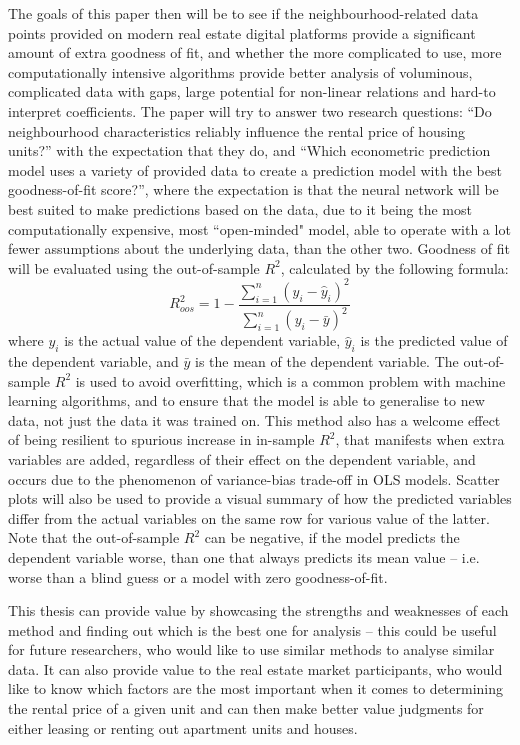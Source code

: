 \documentclass[12pt]{report}
\begin{document}
The goals of this paper then will be to see if the neighbourhood-related data points provided on modern real estate digital platforms provide a significant amount of extra goodness of fit, and whether the more complicated to use, more computationally intensive algorithms provide better analysis of voluminous, complicated data with gaps, large potential for non-linear relations and hard-to interpret coefficients. The paper will try to answer two research questions: “Do neighbourhood characteristics reliably influence the rental price of housing units?”  with the expectation that they do, and “Which econometric prediction model uses a variety of provided data to create a prediction model with the best goodness-of-fit score?”, where the expectation is that the neural network will be best suited to make predictions based on the data, due to it being the most computationally expensive, most ``open-minded" model, able to operate with a lot fewer assumptions about the underlying data, than the other two. Goodness of fit will be evaluated using the out-of-sample $R^2$, calculated by the following formula:
\begin{equation}
	R^2_{oos} = 1 - \frac{\sum_{i=1}^{n}(y_i - \hat{y}_i)^2}{\sum_{i=1}^{n}(y_i - \bar{y})^2}
\end{equation}
where $y_i$ is the actual value of the dependent variable, $\hat{y}_i$ is the predicted value of the dependent variable, and $\bar{y}$ is the mean of the dependent variable. The out-of-sample $R^2$ is used to avoid overfitting, which is a common problem with machine learning algorithms, and to ensure that the model is able to generalise to new data, not just the data it was trained on. This method also has a welcome effect of being resilient to spurious increase in in-sample $R^2$, that manifests when extra variables are added, regardless of their effect on the dependent variable, and occurs due to the phenomenon of variance-bias trade-off in OLS models. Scatter plots will also be used to provide a visual summary of how the predicted variables differ from the actual variables on the same row for various value of the latter. Note that the out-of-sample $R^2$ can be negative, if the model predicts the dependent variable worse, than one that always predicts its mean value -- i.e. worse than a blind guess or a model with zero goodness-of-fit.

This thesis can provide value by showcasing the strengths and weaknesses of each method and finding out which is the best one for analysis -- this could be useful for future researchers, who would like to use similar methods to analyse similar data. It can also provide value to the real estate market participants, who would like to know which factors are the most important when it comes to determining the rental price of a given unit and can then make better value judgments for either leasing or renting out apartment units and houses.
\end{document}

